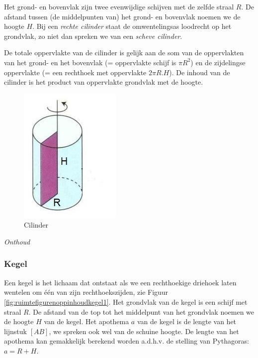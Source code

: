 Het grond- en bovenvlak zijn twee evenwijdige schijven met de zelfde straal $R$. De afstand tussen (de middelpunten van) het grond- en bovenvlak noemen we de hoogte $H$. Bij een \emph{rechte cilinder} staat de omwentelingsas loodrecht op het grondvlak, zo niet dan spreken we van een \emph{scheve cilinder}.

De totale oppervlakte van de cilinder is gelijk aan de som van de oppervlakten van het grond- en het bovenvlak (= oppervlakte schijf is $\pi R^2$) en de zijdelingse oppervlakte (= een rechthoek met oppervlakte $2\pi R.H$). De inhoud van de cilinder is het product van oppervlakte grondvlak met de hoogte.

\begin{figure}[h]
	\centering
	\includegraphics[width=0.3\linewidth]{4_opp_inhoud_an_meetk/inputs/RuimteFigurenOppInhoud_cilinder1}
	\caption{Cilinder}
	\label{fig:ruimtefigurenoppinhoudcilinder1}
\end{figure}

\emph{Onthoud}


\subsubsection{Kegel}
Een kegel is het lichaam dat ontstaat als we een rechthoekige driehoek laten wentelen om \'e\'en van zijn rechthoekszijden, zie Figuur \ref{fig:ruimtefigurenoppinhoudkegel1}. Het grondvlak van de kegel is een schijf met straal $R$. De afstand van de top tot het middelpunt van het grondvlak noemen we de hoogte $H$ van de kegel. Het apothema $a$ van de kegel is de lengte van het lijnstuk $[AB]$, we spreken ook wel van de schuine hoogte. De lengte van het apothema kan gemakkelijk berekend worden a.d.h.v. de stelling van Pythagoras: $a=R+H$.

